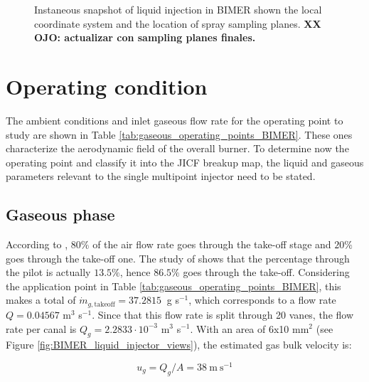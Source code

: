 \begin{figure}[h!]
	\centering
	\vspace*{-0.5in}
	\caption{Instaneous snapshot of liquid injection in BIMER shown the local coordinate system and the location of spray sampling planes. \textbf{XX OJO: actualizar con sampling planes finales.}}
	\label{fig:BIMER_local_FoR_and_sampling_planes}
\end{figure}


\section{Operating condition}
\label{sec:ch8_BIMER_operating_condition}

The ambient conditions and inlet gaseous flow rate for the operating point to study are shown in Table \ref{tab:gaseous_operating_points_BIMER}. These ones characterize the aerodynamic field of the overall burner. To determine now the operating point and classify it into the JICF breakup map, the liquid and gaseous parameters relevant to the single multipoint injector need to be stated.


\subsection{Gaseous phase}

According to , $80 \%$ of the air flow rate goes through the take-off stage and $20 \%$ goes through the take-off one. The study of  shows that the percentage through the pilot is actually $13.5 \%$, hence $86.5 \%$ goes through the take-off. Considering the application point in Table \ref{tab:gaseous_operating_points_BIMER}, this makes a total of $\dot{m}_{g,\mathrm{takeoff}} = 37.2815 ~ $ g s$^{-1}$, which corresponds to a flow rate $Q = 0.04567 $ m$^{3}$ s$^{-1}$. Since that this flow rate is split through 20 vanes, the flow rate per canal is $Q_g = 2.2833 \cdot 10^{-3}$ m$^{3}$ s$^{-1}$. With an area of 6x10 mm$^2$ (see Figure \ref{fig:BIMER_liquid_injector_views}), the estimated gas bulk velocity is:

\begin{equation}
u_g = Q_g/A = 38 ~ \mathrm{m} ~ \mathrm{s}^{-1}
\end{equation}

